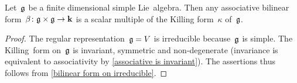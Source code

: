 \begin{corollary}
  \label{uniqueness of invariant bilinear forms for simple}
  Let~$\mathfrak{g}$ be a finite dimensional simple Lie~algebra.
  Then any associative bilinear form~$\beta \colon \mathfrak{g} \times \mathfrak{g} \to \mathbf{k}$ is a scalar multiple of the Killing form~$\kappa$ of~$\mathfrak{g}$.
\end{corollary}


\begin{proof}
  The regular representation~$\mathfrak{g} = V$ is irreducible because~$\mathfrak{g}$ is simple.
  The Killing~form on~$\mathfrak{g}$ is invariant, symmetric and non-degenerate (invariance is equivalent to associativity by \cref{associative is invariant}).
  The assertions thus follows from \cref{bilinear form on irreducible}.
\end{proof}




